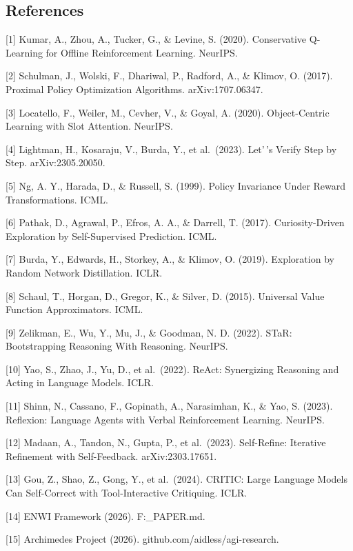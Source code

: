 \documentclass[
]{article}
\begin{document}
\subsection{References}\label{references}

{[}1{]} Kumar, A., Zhou, A., Tucker, G., \& Levine, S. (2020).
Conservative Q-Learning for Offline Reinforcement Learning. NeurIPS.

{[}2{]} Schulman, J., Wolski, F., Dhariwal, P., Radford, A., \& Klimov,
O. (2017). Proximal Policy Optimization Algorithms. arXiv:1707.06347.

{[}3{]} Locatello, F., Weiler, M., Cevher, V., \& Goyal, A. (2020).
Object-Centric Learning with Slot Attention. NeurIPS.

{[}4{]} Lightman, H., Kosaraju, V., Burda, Y., et al.~(2023). Let'\,'s
Verify Step by Step. arXiv:2305.20050.

{[}5{]} Ng, A. Y., Harada, D., \& Russell, S. (1999). Policy Invariance
Under Reward Transformations. ICML.

{[}6{]} Pathak, D., Agrawal, P., Efros, A. A., \& Darrell, T. (2017).
Curiosity-Driven Exploration by Self-Supervised Prediction. ICML.

{[}7{]} Burda, Y., Edwards, H., Storkey, A., \& Klimov, O. (2019).
Exploration by Random Network Distillation. ICLR.

{[}8{]} Schaul, T., Horgan, D., Gregor, K., \& Silver, D. (2015).
Universal Value Function Approximators. ICML.

{[}9{]} Zelikman, E., Wu, Y., Mu, J., \& Goodman, N. D. (2022). STaR:
Bootstrapping Reasoning With Reasoning. NeurIPS.

{[}10{]} Yao, S., Zhao, J., Yu, D., et al.~(2022). ReAct: Synergizing
Reasoning and Acting in Language Models. ICLR.

{[}11{]} Shinn, N., Cassano, F., Gopinath, A., Narasimhan, K., \& Yao,
S. (2023). Reflexion: Language Agents with Verbal Reinforcement
Learning. NeurIPS.

{[}12{]} Madaan, A., Tandon, N., Gupta, P., et al.~(2023). Self-Refine:
Iterative Refinement with Self-Feedback. arXiv:2303.17651.

{[}13{]} Gou, Z., Shao, Z., Gong, Y., et al.~(2024). CRITIC: Large
Language Models Can Self-Correct with Tool-Interactive Critiquing. ICLR.

{[}14{]} ENWI Framework (2026). F:\TMLR\Fusion\ENWI\_PAPER.md.

{[}15{]} Archimedes Project (2026). github.com/aidless/agi-research.
\end{document}
